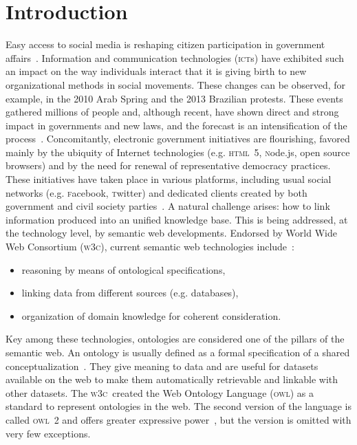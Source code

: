 \documentclass[10pt,letterpaper]{article}
\newcommand{\owl}{\textsc{owl}}
\newcommand{\ict}{\textsc{ict}}
\newcommand{\html}{\textsc{html}}
\newcommand{\node}{\textsc{n}ode.js}
\newcommand{\facebook}{\textsc{f}acebook}
\newcommand{\twitter}{\textsc{t}witter}
\newcommand{\wwwc}{\textsc{w3c}}
\begin{document}
\section{Introduction}\label{sec:into}
Easy access to social media is reshaping citizen participation in government affairs~\cite{socMed}. 
Information and communication technologies (\ict s) have exhibited such an impact on the way individuals interact
 that it is giving birth to new organizational methods in social movements. These changes can be observed, for example, in the 2010 Arab Spring and the 2013 Brazilian protests. These events gathered millions of people and, although recent, have shown direct and strong impact in governments and new laws, and the forecast is an intensification of the process~\cite{digRev1,digRev2,digRev3}.
Concomitantly, electronic government initiatives are flourishing, favored mainly by the ubiquity of Internet technologies (e.g. \html\ 5, \node, open source browsers) and by the need for renewal of representative democracy practices. 
These initiatives have taken place in various platforms, including usual social networks (e.g. \facebook, \twitter)
 and dedicated clients created by both government and civil society parties~\cite{socMed,pita2010arquitetura,barros2010alem,knowledge}.
A natural challenge arises: how to link information produced into an unified knowledge base. This is being addressed, at the technology level, by semantic web developments. Endorsed by World Wide Web Consortium (\wwwc), current semantic web technologies include~\cite{Sem1}:
\begin{itemize}
    \item reasoning by means of ontological specifications,
    \item linking data from different sources (e.g. databases),
    \item organization of domain knowledge for coherent consideration.
\end{itemize}

\noindent Key among these technologies, ontologies are considered one of the pillars of the semantic web. An ontology is usually defined as a formal specification of a shared conceptualization~\cite{gruber}.
They give meaning to data and are useful for datasets available on the web to make them automatically retrievable and linkable with other datasets. The \wwwc\ created the Web Ontology Language (\owl) as a standard to represent ontologies in the web.
The second version of the language is called \owl\ 2 and offers greater expressive power~\cite{owl2}, but the version is omitted with very few exceptions.
\end{document}
